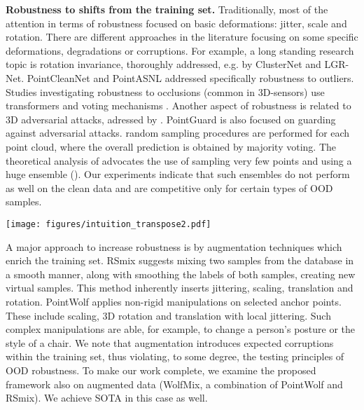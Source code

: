 \documentclass[10pt,twocolumn]{article}
\begin{document}
{\bf Robustness to shifts from the training set.} Traditionally, most of the attention in terms of robustness focused on basic deformations: jitter, scale and rotation.
There are different approaches in the literature focusing on some specific deformations, degradations or corruptions. For example, a long standing research topic is rotation invariance,
thoroughly addressed, e.g. by ClusterNet\cite{clusternet} and  LGR-Net\cite{lgr_net}.
PointCleanNet\cite{pointcleannet} and PointASNL\cite{point_asnl} addressed specifically robustness to outliers.
Studies investigating robustness to occlusions (common in 3D-sensors) use transformers \cite{IT_net} and voting mechanisms \cite{point_set_voting}.
Another aspect of robustness is related to 3D adversarial attacks, adressed by \cite{adversarial_pcs, extending_adversarial}. 
PointGuard\cite{pointguard} is also focused on guarding against adversarial attacks.  random sampling procedures are performed for each point cloud, where the overall prediction is obtained by majority voting.
The theoretical analysis of \cite{pointguard} advocates the use of sampling very few points and using a huge ensemble (). 
Our experiments indicate that such ensembles do not perform as well on the clean data and are competitive only for certain types of OOD samples.

\begin{figure*}[ptbh!]
  \centering
\texttt{[image: figures/intuition\_transpose2.pdf]}
   \caption{{\bf Pointwise Importance}. Left column - corruptions (grey - added points, black - removed points). The rest of the columns show color-coded pointwise importance. 
Although Random is more influenced by Add-local, and Patches+Random by Drop-local (dashed orange circles), the aggregated result is robust to both (dashed grey circles).}
   \label{fig:intuition}
\end{figure*}

A major approach to increase robustness is by augmentation techniques which enrich the training set. RSmix\cite{rsmix} suggests mixing two samples from the database in a smooth manner, along with smoothing the labels of both samples, creating new virtual samples. This method inherently inserts jittering, scaling, translation and rotation. PointWolf\cite{pointwolf} applies non-rigid manipulations on selected anchor points. These include scaling, 3D rotation and translation with local jittering. Such complex manipulations are able, for example, to change a person's posture or the style of a chair. 
We note that augmentation introduces expected corruptions within the training set, thus violating, to some degree, the testing principles of OOD robustness.
To make our work complete, we examine the proposed framework also on augmented data (WolfMix\cite{modelnetc}, a combination of PointWolf and RSmix). We achieve SOTA in this case as well.
\end{document}
